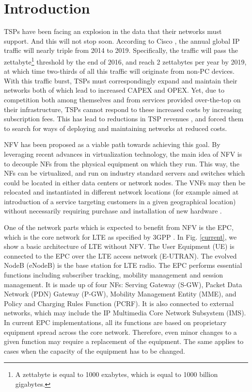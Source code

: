 \documentclass[conference]{IEEEtran}
\begin{document}
\section{Introduction}
\acp{TSP} have been facing an explosion in the data that their networks must support. And this will not stop soon. According to Cisco \cite{Cisco15}, the annual global IP traffic will nearly triple from 2014 to 2019. Specifically, the traffic will pass the zettabyte\footnote{A  zettabyte is equal to 1000 exabytes, which is equal to 1000 billion gigabytes.} threshold by the end of 2016, and reach 2 zettabytes per year by 2019, at which time two-thirds of all this traffic will originate from non-PC devices. With this traffic burst, \acp{TSP} must correspondingly expand and maintain their networks both of which lead to increased \ac{CAPEX} and \ac{OPEX}. Yet, due to competition both among themselves and from services provided over-the-top on their infrastructure, \acp{TSP} cannot respond to these increased costs by increasing subscription fees. This has lead to reductions in \ac{TSP} revenues \cite{nfv}, and forced them to search for ways of deploying and maintaining networks at reduced costs.

\ac{NFV} \cite{Guerzoni12, mano} has been proposed as a viable path towards achieving this goal. By leveraging recent advances in virtualization technology, the main idea of \ac{NFV} is to decouple \acp{NF} from the physical equipment on which they run. This way, the \acp{NF} can be virtualized, and run on industry standard servers and switches which could be located in either data centers or network nodes. The \acp{VNF} may then be relocated and instantiated in different network locations (for example aimed at introduction of a service targeting customers in a given geographical location) without necessarily requiring purchase and installation of new hardware \cite{MijumbiNFV15}.

One of the network parts which is expected to benefit from \ac{NFV} is the \ac{EPC}, which is the core network for \ac{LTE} as specified by 3GPP \cite{3GPP}. In Fig. \ref{current}, we show a basic architecture of \ac{LTE} without \ac{NFV}. The User Equipment (UE) is connected to the \ac{EPC} over the \ac{LTE} access network (E-UTRAN). The evolved NodeB (eNodeB) is the base station for LTE radio. The EPC performs essential functions including subscriber tracking, mobility management and session management. It is made up of four \acp{NF}: Serving Gateway (S-GW), Packet Data Network (PDN) Gateway (P-GW), Mobility Management Entity (MME), and Policy and Charging Rules Function (PCRF). It is also connected to external networks, which may include the IP Multimedia Core Network Subsystem (IMS). In current \ac{EPC} implementations, all its functions are based on proprietary equipment spread across the core network. Therefore, even minor changes to a given function may require a replacement of the equipment. The same applies to cases when the capacity of the equipment has to be changed.
\end{document}

